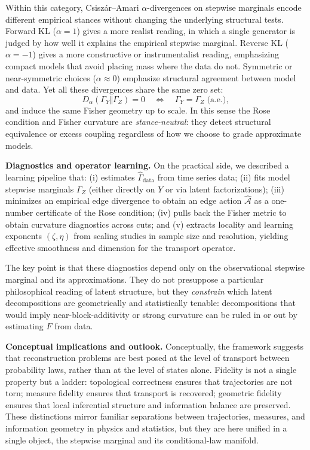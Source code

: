 \documentclass[11pt]{article}
\newcommand{\1}{\mathbf{1}}
\begin{document}
Within this category, Csiszár–Amari $\alpha$-divergences on stepwise marginals encode different empirical stances without changing the underlying structural tests. Forward KL ($\alpha = 1$) gives a more realist reading, in which a single generator is judged by how well it explains the empirical stepwise marginal. Reverse KL ($\alpha = -1$) gives a more constructive or instrumentalist reading, emphasizing compact models that avoid placing mass where the data do not. Symmetric or near-symmetric choices ($\alpha \approx 0$) emphasize structural agreement between model and data. Yet all these divergences share the same zero set:
\[
  D_\alpha(\Gamma_Y\Vert \Gamma_Z) = 0
  \quad\Longleftrightarrow\quad
  \Gamma_Y = \Gamma_Z \;\text{(a.e.)},
\]
and induce the same Fisher geometry up to scale. In this sense the Rose condition and Fisher curvature are \emph{stance-neutral}: they detect structural equivalence or excess coupling regardless of how we choose to grade approximate models.

\medskip
\noindent
\textbf{Diagnostics and operator learning.}
On the practical side, we described a learning pipeline that: (i) estimates $\widehat{\Gamma}_{\mathrm{data}}$ from time series data; (ii) fits model stepwise marginals $\Gamma_Z$ (either directly on $Y$ or via latent factorizations); (iii) minimizes an empirical edge divergence to obtain an edge action $\widehat{\mathcal A}$ as a one-number certificate of the Rose condition; (iv) pulls back the Fisher metric to obtain curvature diagnostics across cuts; and (v) extracts locality and learning exponents $(\zeta,\eta)$ from scaling studies in sample size and resolution, yielding effective smoothness and dimension for the transport operator.

The key point is that these diagnostics depend only on the observational stepwise marginal and its approximations. They do not presuppose a particular philosophical reading of latent structure, but they \emph{constrain} which latent decompositions are geometrically and statistically tenable: decompositions that would imply near-block-additivity or strong curvature can be ruled in or out by estimating $F$ from data.

\medskip
\noindent
\textbf{Conceptual implications and outlook.}
Conceptually, the framework suggests that reconstruction problems are best posed at the level of transport between probability laws, rather than at the level of states alone. Fidelity is not a single property but a ladder: topological correctness ensures that trajectories are not torn; measure fidelity ensures that transport is recovered; geometric fidelity ensures that local inferential structure and information balance are preserved. These distinctions mirror familiar separations between trajectories, measures, and information geometry in physics and statistics, but they are here unified in a single object, the stepwise marginal and its conditional-law manifold.
\end{document}
